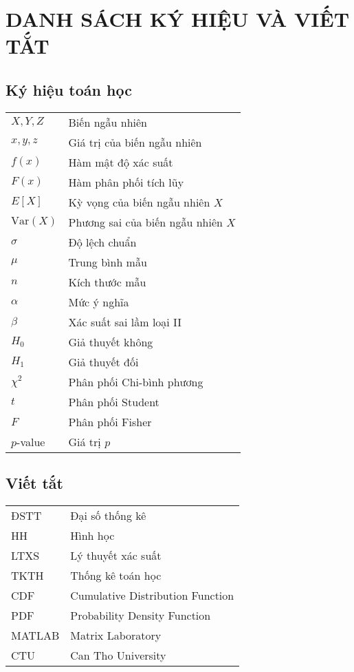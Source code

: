 \chapter*{DANH SÁCH KÝ HIỆU VÀ VIẾT TẮT}

\section*{Ký hiệu toán học}
\begin{tabular}{@{}ll@{}}
$X, Y, Z$ & Biến ngẫu nhiên \\
$x, y, z$ & Giá trị của biến ngẫu nhiên \\
$f(x)$ & Hàm mật độ xác suất \\
$F(x)$ & Hàm phân phối tích lũy \\
$E[X]$ & Kỳ vọng của biến ngẫu nhiên $X$ \\
$\text{Var}(X)$ & Phương sai của biến ngẫu nhiên $X$ \\
$\sigma$ & Độ lệch chuẩn \\
$\mu$ & Trung bình mẫu \\
$n$ & Kích thước mẫu \\
$\alpha$ & Mức ý nghĩa \\
$\beta$ & Xác suất sai lầm loại II \\
$H_0$ & Giả thuyết không \\
$H_1$ & Giả thuyết đối \\
$\chi^2$ & Phân phối Chi-bình phương \\
$t$ & Phân phối Student \\
$F$ & Phân phối Fisher \\
$p$-value & Giá trị $p$ \\
\end{tabular}

\vspace{1cm}

\section*{Viết tắt}
\begin{tabular}{@{}ll@{}}
ĐSTT & Đại số thống kê \\
HH & Hình học \\
LTXS & Lý thuyết xác suất \\
TKTH & Thống kê toán học \\
CDF & Cumulative Distribution Function \\
PDF & Probability Density Function \\
MATLAB & Matrix Laboratory \\
CTU & Can Tho University \\
\end{tabular}
